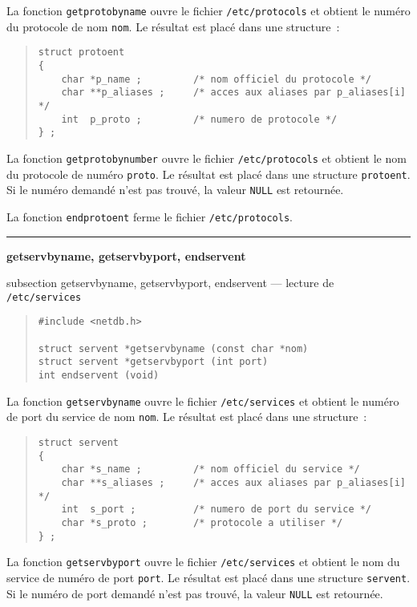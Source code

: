 \documentclass [twoside] {report}
\newcommand {\primitive} [1]
    {
	\phantomsection
	{\large \bf #1}
	\addcontentsline {toc} {subsection} {#1}
    }
\newcommand {\separation}
    {
	\vspace {5mm}
	\nopagebreak
	\hrule
    }
\begin{document}
La fonction {\tt getprotobyname} ouvre le fichier {\tt /etc/protocols}
et obtient le numéro du protocole de nom {\tt nom}.  Le résultat est
placé dans une structure~:

\begin {quote}
    \small
\begin {verbatim}
struct protoent
{
    char *p_name ;         /* nom officiel du protocole */
    char **p_aliases ;     /* acces aux aliases par p_aliases[i] */
    int  p_proto ;         /* numero de protocole */
} ;
\end{verbatim}
\end {quote}

La fonction {\tt getprotobynumber} ouvre le fichier {\tt /etc/protocols}
et obtient le nom du protocole de numéro {\tt proto}.  Le résultat est
placé dans une structure {\tt protoent}.  Si le numéro demandé n'est pas
trouvé, la valeur {\tt NULL} est retournée.

La fonction {\tt endprotoent} ferme le fichier {\tt /etc/protocols}.


\separation
\primitive {getservbyname, getservbyport,
endservent} --- lecture de {\tt /etc/services}

\begin {quote}
\begin {verbatim}
#include <netdb.h>

struct servent *getservbyname (const char *nom)
struct servent *getservbyport (int port)
int endservent (void)
\end{verbatim}
\end {quote}

La fonction {\tt getservbyname} ouvre le fichier {\tt /etc/services} et
obtient le numéro de port du service de nom {\tt nom}.  Le résultat est
placé dans une structure~:

\begin {quote}
    \small
\begin {verbatim}
struct servent
{
    char *s_name ;         /* nom officiel du service */
    char **s_aliases ;     /* acces aux aliases par p_aliases[i] */
    int  s_port ;          /* numero de port du service */
    char *s_proto ;        /* protocole a utiliser */
} ;
\end{verbatim}
\end {quote}

La fonction {\tt getservbyport} ouvre le fichier {\tt /etc/services} et
obtient le nom du service de numéro de port {\tt port}.  Le résultat est
placé dans une structure {\tt servent}.  Si le numéro de port demandé
n'est pas trouvé, la valeur {\tt NULL} est retournée.
\end{document}
